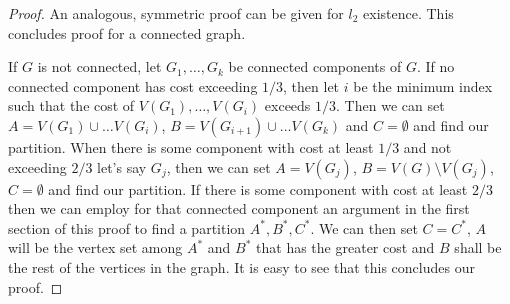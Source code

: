 \begin{proof}
An analogous, symmetric proof can be given for $l_2$ existence. This concludes
proof for a connected graph. 

If $G$ is not connected, let $G_1, \dots, G_k$ be connected components of $G$.
If no connected component has cost exceeding $1/3$, then let $i$ be the minimum
index such that the cost of $V(G_1), \dots, V(G_i)$ exceeds $1/3$. Then we
can set $A = V(G_1) \cup \dots V(G_i)$, $B = V(G_{i+1}) \cup \dots V(G_k)$ and
$C = \emptyset$ and find our partition. When there is some component with cost
at least $1/3$ and not exceeding $2/3$ let's say $G_j$, then we can set $A =
V(G_j)$, $B = V(G) \setminus V(G_j)$, $C = \emptyset$ and find our partition.
If there is some component with cost at least $2/3$ then we can employ for that
connected component an argument in the first section of this proof to find a
partition $A^*, B^*, C^*$. We can then set $C = C^*$, $A$ will be the vertex set
among $A^*$ and $B^*$ that has the greater cost and $B$ shall be the rest of the
vertices in the graph. It is easy to see that this concludes our proof.
\end{proof}

